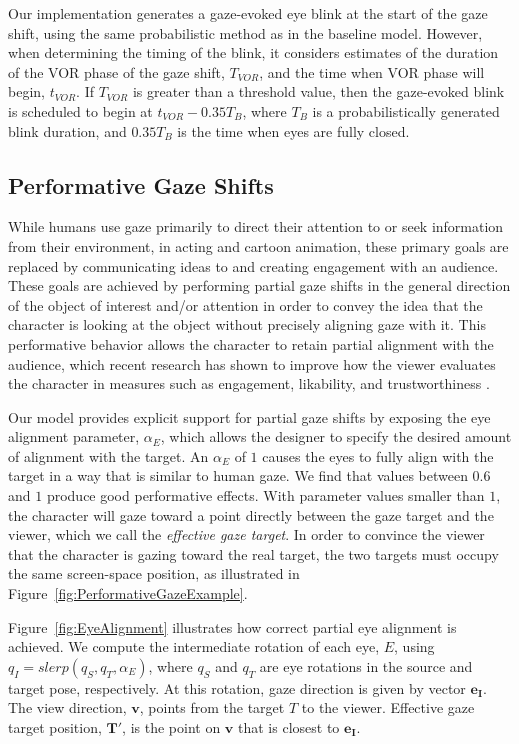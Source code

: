 Our implementation generates a gaze-evoked eye blink at the start of the gaze shift, using the same probabilistic method as in the baseline model. However, when determining the timing of the blink, it considers estimates of the duration of the VOR phase of the gaze shift, $T_{VOR}$, and the time when VOR phase will begin, $t_{VOR}$. If $T_{VOR}$ is greater than a threshold value, then the gaze-evoked blink is scheduled to begin at $t_{VOR} - 0.35T_{B}$, where $T_B$ is a probabilistically generated blink duration, and $0.35T_B$ is the time when eyes are fully closed.

\subsection{Performative Gaze Shifts}

While humans use gaze primarily to direct their attention to or seek information from their environment, in acting and cartoon animation, these primary goals are replaced by communicating ideas to and creating engagement with an audience. These goals are achieved by performing partial gaze shifts in the general direction of the object of interest and/or attention in order to convey the idea that the character is looking at the object without precisely aligning gaze with it. This performative behavior allows the character to retain partial alignment with the audience, which recent research has shown to improve how the viewer evaluates the character in measures such as engagement, likability, and trustworthiness \cite{andrist2012designing}.

Our model provides explicit support for partial gaze shifts by exposing the eye alignment parameter, $\alpha_E$, which allows the designer to specify the desired amount of alignment with the target. An $\alpha_E$ of $1$ causes the eyes to fully align with the target in a way that is similar to human gaze. We find that values between $0.6$ and $1$ produce good performative effects.
With parameter values smaller than $1$, the character will gaze toward a point directly between the gaze target and the viewer, which we call the \textit{effective gaze target}. In order to convince the viewer that the character is gazing toward the real target, the two targets must occupy the same screen-space position, as illustrated in Figure~\ref{fig:PerformativeGazeExample}.

Figure~\ref{fig:EyeAlignment} illustrates how correct partial eye alignment is achieved. We compute the intermediate rotation of each eye, $E$, using $q_I = slerp ( q_S, q_T, \alpha_E )$, where $q_S$ and $q_T$ are eye rotations in the source and target pose, respectively. At this rotation, gaze direction is given by vector $\mathbf{e_I}$. The view direction, $\mathbf{v}$, points from the target $T$ to the viewer. Effective gaze target position, $\mathbf{T'}$, is the point on $\mathbf{v}$ that is closest to $\mathbf{e_I}$.

